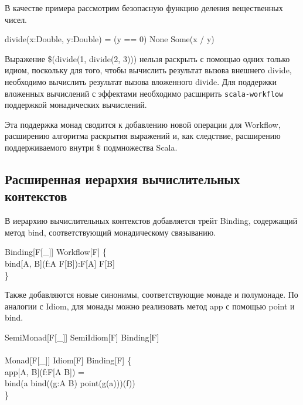 В качестве примера рассмотрим безопасную функцию деления вещественных чисел.

\begin{haskell}
 divide(x:Double, y:Double) =  (y == 0) None  Some(x / y)
\end{haskell}

Выражение \<\$(divide(1, divide(2, 3)))\> нельзя раскрыть с помощью одних только идиом, поскольку для того, чтобы вычислить результат вызова внешнего \<divide\>, необходимо вычислить результат вызова вложенного \<divide\>. Для поддержки вложенных вычислений с эффектами необходимо расширить \texttt{scala-workflow} поддержкой монадических вычислений.

Эта поддержка монад сводится к добавлению новой операции для \<Workflow\>, расширению алгоритма раскрытия выражений и, как следствие, расширению поддерживаемого внутри $\$$ подмножества Scala.

\subsection{Расширенная иерархия вычислительных контекстов}
В иерархию вычислительных контекстов добавляется трейт \<Binding\>, содержащий метод \<bind\>, соответствующий монадическому связыванию.

\begin{haskell}
 Binding[F[\_]]  Workflow[F] \{ \\
\quad\quad {} bind[A, B](f:A \Rightarrow F[B]):F[A] \Rightarrow F[B] \\
\}
\end{haskell}

Также добавляются новые синонимы, соответствующие монаде и полумонаде. По аналогии с \<Idiom\>, для монады можно реализовать метод \<app\> с помощью \<point\> и \<bind\>.

\begin{haskell}
 SemiMonad[F[\_]]  SemiIdiom[F]  Binding[F] \\
{}\\
 Monad[F[\_]]  Idiom[F]  Binding[F] \{\\
\quad\quad {} app[A, B](f:F[A \Rightarrow B]) = \\
\quad\quad\quad bind(a \Rightarrow bind((g:A \Rightarrow B) \Rightarrow point(g(a)))(f))\\
\}
\end{haskell}


